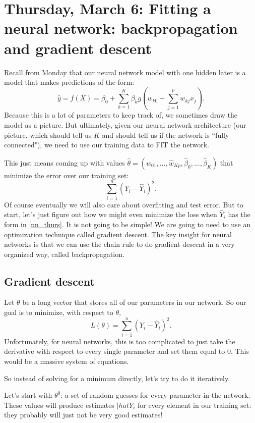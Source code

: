 \section{Thursday, March 6: Fitting a neural network: backpropagation and gradient descent}

Recall from Monday that our neural network model with one hidden later is a model that makes predictions of the form:
\begin{equation}
\label{nn_thurs}
\hat{y} = f(X) = \beta_0 + \sum_{k=1}^K \beta_k g\left(w_{k0}+\sum_{j=1}^p w_{kj} x_j\right). 
\end{equation}
Because this is a lot of parameters to keep track of, we sometimes draw the model as a picture. But ultimately, given our neural network architecture (our picture, which should tell us $K$ and should tell us if the network is ``fully connected"), we need to use our training data to FIT the network.

This just means coming up with values $\hat{\theta} = (\hat{w}_{01}, \ldots, \hat{w}_{Kp}, \hat{\beta}_0, \ldots, \hat{\beta}_K)$ that minimize the error over our training set: 
$$
\sum_{i=1}^n (Y_i - \hat{Y}_i)^2.
$$
Of course eventually we will also care about overfitting and test error. But to start, let's just figure out how we might even minimize the loss when $\hat{Y}_i$ has the form in \eqref{nn_thurs}. It is not going to be simple! We are going to need to use an optimization technique called gradient descent. The key insight for neural networks is that we can use the chain rule to do gradient descent in a very organized way, called backpropagation. 

\subsection{Gradient descent}

Let $\theta$ be a long vector that stores all of our parameters in our network. So our goal is to minimize, with respect to $\theta$, 
$$
L(\theta) = \sum_{i=1}^n (Y_i - \hat{Y}_i)^2.
$$
Unfortunately, for neural networks, this is too complicated to just take the derivative with respect to every single parameter and set them equal to $0$. This would be a massive system of equations.

So instead of solving for a minimum directly, let's try to do it iteratively.

Let's start with $\theta^{0}$: a set of random guesses for every parameter in the network. These values will produce estimates $|hat{Y}_i$ for every element in our training set: they probably will just not be very good estimates!

